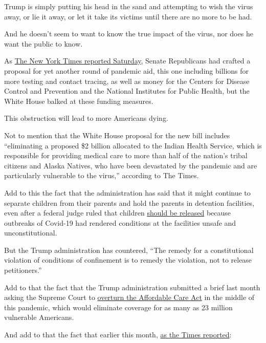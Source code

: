 Trump is simply putting his head in the sand and attempting to wish the
virus away, or lie it away, or let it take its victims until there are
no more to be had.

And he doesn't seem to want to know the true impact of the virus, nor
does he want the public to know.

As
\href{https://www.nytimes.com/2020/07/18/us/politics/trump-virus-testing-relief-congress.html}{The
New York Times reported Saturday}, Senate Republicans had crafted a
proposal for yet another round of pandemic aid, this one including
billions for more testing and contact tracing, as well as money for the
Centers for Disease Control and Prevention and the National Institutes
for Public Health, but the White House balked at these funding measures.

This obstruction will lead to more Americans dying.

Not to mention that the White House proposal for the new bill includes
``eliminating a proposed \$2 billion allocated to the Indian Health
Service, which is responsible for providing medical care to more than
half of the nation's tribal citizens and Alaska Natives, who have been
devastated by the pandemic and are particularly vulnerable to the
virus,'' according to The Times.

Add to this the fact that the administration has said that it might
continue to separate children from their parents and hold the parents in
detention facilities, even after a federal judge ruled that children
\href{https://www.washingtonpost.com/local/legal-issues/us-may-separate-families-after-federal-judge-orders-ice-to-free-migrant-children/2020/07/07/a1758ad6-c067-11ea-b178-bb7b05b94af1_story.html}{should
be released} because outbreaks of Covid-19 had rendered conditions at
the facilities unsafe and unconstitutional.

But the Trump administration has countered, ``The remedy for a
constitutional violation of conditions of confinement is to remedy the
violation, not to release petitioners.''

Add to that the fact that the Trump administration submitted a brief
last month asking the Supreme Court to
\href{https://www.nytimes.com/2020/06/26/us/politics/obamacare-trump-administration-supreme-court.html}{overturn
the Affordable Care Act} in the middle of this pandemic, which would
eliminate coverage for as many as 23 million vulnerable Americans.

And add to that the fact that earlier this month,
\href{https://www.nytimes.com/2020/07/07/us/politics/coronavirus-trump-who.html}{as
the Times reported}:

